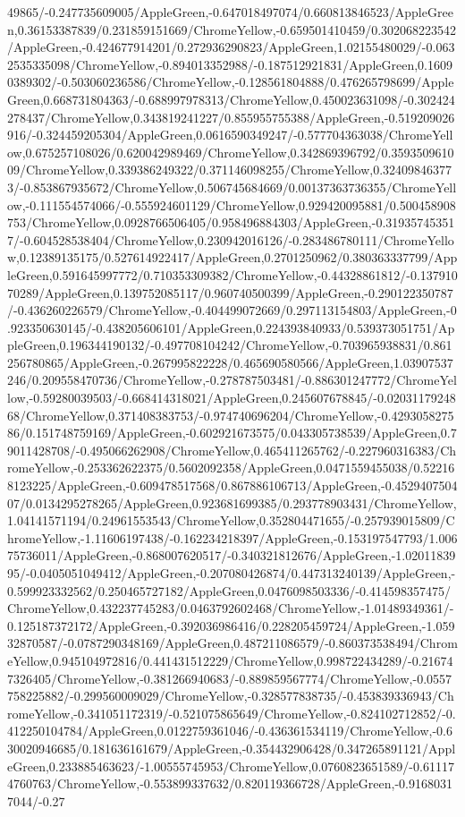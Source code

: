 {\begin{tikzternal}
49865/-0.247735609005/AppleGreen,-0.647018497074/0.660813846523/AppleGreen,0.36153387839/0.231859151669/ChromeYellow,-0.659501410459/0.302068223542/AppleGreen,-0.424677914201/0.272936290823/AppleGreen,1.02155480029/-0.0632535335098/ChromeYellow,-0.894013352988/-0.187512921831/AppleGreen,0.16090389302/-0.503060236586/ChromeYellow,-0.128561804888/0.476265798699/AppleGreen,0.668731804363/-0.688997978313/ChromeYellow,0.450023631098/-0.302424278437/ChromeYellow,0.343819241227/0.855955755388/AppleGreen,-0.519209026916/-0.324459205304/AppleGreen,0.0616590349247/-0.577704363038/ChromeYellow,0.675257108026/0.620042989469/ChromeYellow,0.342869396792/0.359350961009/ChromeYellow,0.339386249322/0.371146098255/ChromeYellow,0.324098463773/-0.853867935672/ChromeYellow,0.506745684669/0.00137363736355/ChromeYellow,-0.111554574066/-0.555924601129/ChromeYellow,0.929420095881/0.500458908753/ChromeYellow,0.0928766506405/0.958496884303/AppleGreen,-0.319357453517/-0.604528538404/ChromeYellow,0.230942016126/-0.283486780111/ChromeYellow,0.12389135175/0.527614922417/AppleGreen,0.2701250962/0.380363337799/AppleGreen,0.591645997772/0.710353309382/ChromeYellow,-0.44328861812/-0.13791070289/AppleGreen,0.139752085117/0.960740500399/AppleGreen,-0.290122350787/-0.436260226579/ChromeYellow,-0.404499072669/0.297113154803/AppleGreen,-0.923350630145/-0.438205606101/AppleGreen,0.224393840933/0.539373051751/AppleGreen,0.196344190132/-0.497708104242/ChromeYellow,-0.703965938831/0.861256780865/AppleGreen,-0.267995822228/0.465690580566/AppleGreen,1.03907537246/0.209558470736/ChromeYellow,-0.278787503481/-0.886301247772/ChromeYellow,-0.59280039503/-0.668414318021/AppleGreen,0.245607678845/-0.0203117924868/ChromeYellow,0.371408383753/-0.974740696204/ChromeYellow,-0.429305827586/0.151748759169/AppleGreen,-0.602921673575/0.043305738539/AppleGreen,0.79011428708/-0.495066262908/ChromeYellow,0.465411265762/-0.227960316383/ChromeYellow,-0.253362622375/0.5602092358/AppleGreen,0.0471559455038/0.522168123225/AppleGreen,-0.609478517568/0.867886106713/AppleGreen,-0.452940750407/0.0134295278265/AppleGreen,0.923681699385/0.293778903431/ChromeYellow,1.04141571194/0.24961553543/ChromeYellow,0.352804471655/-0.257939015809/ChromeYellow,-1.11606197438/-0.162234218397/AppleGreen,-0.153197547793/1.00675736011/AppleGreen,-0.868007620517/-0.340321812676/AppleGreen,-1.0201183995/-0.0405051049412/AppleGreen,-0.207080426874/0.447313240139/AppleGreen,-0.599923332562/0.250465727182/AppleGreen,0.0476098503336/-0.414598357475/ChromeYellow,0.432237745283/0.0463792602468/ChromeYellow,-1.01489349361/-0.125187372172/AppleGreen,-0.392036986416/0.228205459724/AppleGreen,-1.05932870587/-0.0787290348169/AppleGreen,0.487211086579/-0.860373538494/ChromeYellow,0.945104972816/0.441431512229/ChromeYellow,0.998722434289/-0.216747326405/ChromeYellow,-0.381266940683/-0.889859567774/ChromeYellow,-0.0557758225882/-0.299560009029/ChromeYellow,-0.328577838735/-0.453839336943/ChromeYellow,-0.341051172319/-0.521075865649/ChromeYellow,-0.824102712852/-0.412250104784/AppleGreen,0.0122759361046/-0.436361534119/ChromeYellow,-0.630020946685/0.181636161679/AppleGreen,-0.354432906428/0.347265891121/AppleGreen,0.233885463623/-1.00555745953/ChromeYellow,0.0760823651589/-0.611174760763/ChromeYellow,-0.553899337632/0.820119366728/AppleGreen,-0.91680317044/-0.27
\end{tikzternal}}
